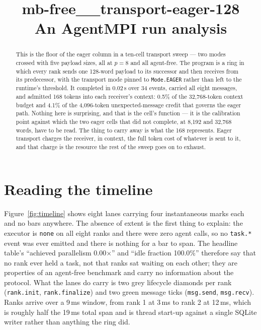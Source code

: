 \documentclass[11pt]{article}
\title{\textbf{mb-free\_\_transport-eager-128}\\[2pt]\large An AgentMPI run analysis}
\author{}
\date{}
\begin{document}
\maketitle

\begin{abstract}
This is the floor of the eager column in a ten-cell transport sweep --- two modes
crossed with five payload sizes, all at $p = 8$ and all agent-free. The program is a
ring in which every rank sends one 128-word payload to its successor and then
receives from its predecessor, with the transport mode pinned to \texttt{Mode.EAGER}
rather than left to the runtime's threshold. It completed in 0.02\,s over 34 events,
carried all eight messages, and admitted 168 tokens into each receiver's context:
0.5\% of the 32{,}768-token context budget and 4.1\% of the 4{,}096-token
unexpected-message credit that governs the eager path. Nothing here is surprising,
and that is the cell's function --- it is the calibration point against which the two
eager cells that did not complete, at 8{,}192 and 32{,}768 words, have to be read.
The thing to carry away is what the 168 represents. Eager transport charges the
receiver, in context, the full token cost of whatever is sent to it, and that charge
is the resource the rest of the sweep goes on to exhaust.
\end{abstract}



\section{Reading the timeline}

Figure~\ref{fig:timeline} shows eight lanes carrying four instantaneous marks each
and no bars anywhere. The absence of extent is the first thing to explain: the
executor is \texttt{none} on all eight ranks and there were zero agent calls, so no
\texttt{task.*} event was ever emitted and there is nothing for a bar to span. The
headline table's ``achieved parallelism 0.00$\times$'' and ``idle fraction 100.0\%''
therefore say that no rank ever held a task, not that ranks sat waiting on each
other; they are properties of an agent-free benchmark and carry no information about
the protocol. What the lanes do carry is two grey lifecycle diamonds per rank
(\texttt{rank.init}, \texttt{rank.finalize}) and two green message ticks
(\texttt{msg.send}, \texttt{msg.recv}). Ranks arrive over a 9\,ms window, from rank 1
at 3\,ms to rank 2 at 12\,ms, which is roughly half the 19\,ms total span and is
thread start-up against a single SQLite writer rather than anything the ring did.
\end{document}
